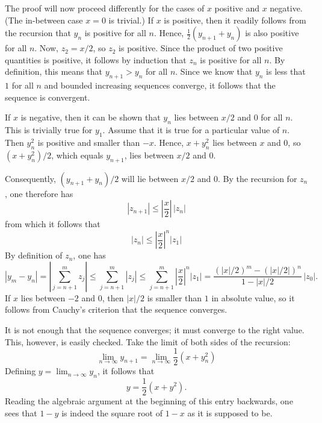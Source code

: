 \documentclass[12pt]{article}
\begin{document}
The proof will now proceed differently for the cases of $x$ positive and $x$ negative. (The in-between case $x=0$ is trivial.)  If $x$ is positive, then it readily follows from the recursion that   $y_n$ is positive for all $n$.  Hence, $\frac{1}{2} (y_{n+1} + y_n)$ is also positive for all $n$.  Now, $z_2 = x/2$, so $z_2$ is positive.  Since the product of two positive quantities is positive, it follows by induction that $z_n$ is positive for all $n$.  By definition, this means that $y_{n+1} > y_n$ for all $n$.  Since we know that $y_n$ is less that $1$ for all $n$ and bounded increasing sequences converge, it follows that the sequence is convergent.

If $x$ is negative, then it can be shown that $y_n$ lies between $x/2$ and $0$ for all $n$.  This is trivially true for $y_1$.  Assume that it is true for a particular value of $n$.  Then $y_n^2$ is positive and smaller than $-x$.  Hence, $x + y_n^2$ lies between $x$ and $0$, so $(x + y_n^2)/2$, which equals $y_{n+1}$, lies between $x/2$ and $0$.

Consequently, $(y_{n+1} + y_n)/2$ will lie between $x/2$ and $0$.  By the recursion for $z_n$, one therefore has
 \[ |z_{n+1}| \le \left| \frac{x}{2} \right| \, |z_n| \]
from which it follows that
 \[ |z_n| \le \left| \frac{x}{2} \right|^n |z_1| \]
By definition of $z_n$, one has
 \[ | y_m - y_n | = \left| \sum_{j=n+1}^m z_j \right| \le \sum_{j=n+1}^m |z_j| \le \sum_{j=n+1}^m \left| \frac{x}{2} \right|^n |z_1| = \frac{(|x|/2)^m - (|x|/2|)^n}{1 - |x|/2} \, |z_0| .\]
If $x$ lies between $-2$ and $0$, then $|x|/2$ is smaller than $1$ in absolute value, so it follows from Cauchy's criterion that the sequence converges.

It is not enough that the sequence converges; it must converge to the right value.  This, however, is easily checked.  Take the limit of both sides of the recursion:
 \[ \lim_{n \to \infty} y_{n+1} = \lim_{n \to \infty} \frac{1}{2} (x + y_n^2) \]
Defining $y = \lim_{n \to \infty} y_n$, it follows that
 \[ y = \frac{1}{2} (x + y^2) .\]
Reading the algebraic argument at the beginning of this entry backwards, one sees that $1 - y$ is indeed the square root of $1 - x$ as it is supposed to be.
\end{document}
